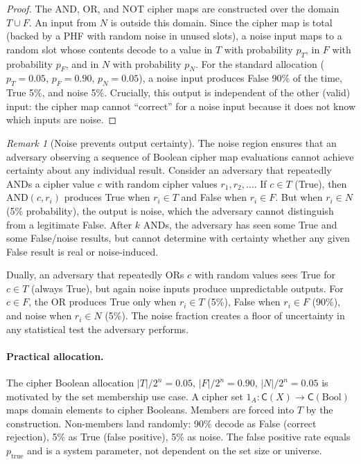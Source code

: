 \documentclass[11pt]{article}
\theoremstyle{definition}
\theoremstyle{plain}
\theoremstyle{remark}
\newtheorem{remark}{Remark}[section]
\newcommand{\cipher}[1]{\mathsf{C}(#1)}
\begin{document}
\begin{proof}
The AND, OR, and NOT cipher maps are constructed over the domain
$T \cup F$.
An input from $N$ is outside this domain.
Since the cipher map is total (backed by a PHF with random noise in
unused slots), a noise input maps to a random slot whose contents decode
to a value in $T$ with probability $p_T$, in $F$ with probability $p_F$,
and in $N$ with probability $p_N$.
For the standard allocation ($p_T = 0.05$, $p_F = 0.90$, $p_N = 0.05$),
a noise input produces False 90\% of the time, True 5\%, and noise 5\%.
Crucially, this output is independent of the other (valid) input:
the cipher map cannot ``correct'' for a noise input because it does not
know which inputs are noise.
\end{proof}

\begin{remark}[Noise prevents output certainty]
The noise region ensures that an adversary observing a sequence of
Boolean cipher map evaluations cannot achieve certainty about any
individual result.
Consider an adversary that repeatedly ANDs a cipher value $c$ with
random cipher values $r_1, r_2, \ldots$.
If $c \in T$ (True), then $\mathrm{AND}(c, r_i)$ produces True when
$r_i \in T$ and False when $r_i \in F$.
But when $r_i \in N$ (5\% probability), the output is noise, which the
adversary cannot distinguish from a legitimate False.
After $k$ ANDs, the adversary has seen some True and some False/noise
results, but cannot determine with certainty whether any given False
result is real or noise-induced.

Dually, an adversary that repeatedly ORs $c$ with random values sees
True for $c \in T$ (always True), but again noise inputs produce
unpredictable outputs.
For $c \in F$, the OR produces True only when $r_i \in T$ (5\%),
False when $r_i \in F$ (90\%), and noise when $r_i \in N$ (5\%).
The noise fraction creates a floor of uncertainty in any statistical
test the adversary performs.
\end{remark}

\paragraph{Practical allocation.}
The cipher Boolean allocation $|T|/2^n = 0.05$, $|F|/2^n = 0.90$,
$|N|/2^n = 0.05$ is motivated by the set membership use case.
A cipher set $\hat{1}_A : \cipher{X} \to \cipher{\mathrm{Bool}}$
maps domain elements to cipher Booleans.
Members are forced into $T$ by the construction.
Non-members land randomly: 90\% decode as False (correct rejection),
5\% as True (false positive), 5\% as noise.
The false positive rate equals $p_{\mathrm{true}}$ and is a system
parameter, not dependent on the set size or universe.
\end{document}
